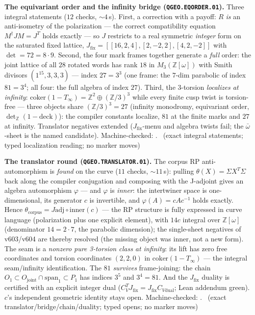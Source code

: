 \documentclass[11pt,a4paper]{article}
\theoremstyle{definition}
\begin{document}
\par\smallskip\noindent\textbf{The equivariant order and the infinity
bridge (\texttt{QGEO.EQORDER.01}).}
Three integral statements ($12$ checks, ${\sim}4$\,s).  First, a
correction with a payoff: $R$ \emph{is} an anti-isometry of the
polarization --- the correct compatibility equation
$M^\dagger JM=J^T$ holds exactly --- so $J$ restricts to a real
symmetric \emph{integer} form on the saturated fixed lattice,
$J_{\mathrm{fix}}=[[16,2,4],[2,-2,2],[4,2,-2]]$ with
$\det=72=8\cdot9$.  Second, the four mark frames together generate a
\emph{full} order: the joint lattice of all $28$ rotated words has
rank $18$ in $M_3(\mathbb{Z}[\omega])$ with Smith divisors
$(1^{15},3,3,3)$ --- index $27=3^3$ (one frame: the $7$-dim parabolic
of index $81=3^4$; all four: the full algebra of index $27$).  Third,
the 3-torsion \emph{localizes at infinity}:
$\mathrm{coker}(1-T_\infty)=\mathbb{Z}^2\oplus(\mathbb{Z}/3)^3$ while
every finite cusp twist is torsion-free --- three objects share
$(\mathbb{Z}/3)^3=27$ (infinity monodromy, equivariant order,
$\det_{\mathbb{Z}}(1-\mathrm{deck})$): the compiler constants
localize, $81$ at the finite marks and $27$ at infinity.  Translator
negatives extended ($J_{\mathrm{fix}}$-menu and algebra twists fail;
the $\bar\omega$-sheet is the named candidate).
Machine-checked: .
\mE\ (exact integral statements; typed localization reading; no
marker moves)
\par\smallskip

\par\smallskip\noindent\textbf{The translator round
(\texttt{QGEO.TRANSLATOR.01}).}
The corpus RP anti-automorphism is \emph{found} on the curve ($11$
checks, ${\sim}11$\,s): pulling $\theta(X)=\Sigma X^T\Sigma$ back
along the compiler conjugation and composing with the J-adjoint gives
an algebra automorphism $\varphi$ --- and $\varphi$ is \emph{inner}:
the intertwiner space is one-dimensional, its generator $c$ is
invertible, and $\varphi(A)=cAc^{-1}$ holds exactly.  Hence
$\theta_{\mathrm{corpus}}=J\mathrm{adj}\circ\mathrm{inner}(c)$ --- the
RP structure is fully expressed in curve language (polarization plus
one explicit element), with $14c$ integral over
$\mathbb{Z}[\omega]$ (denominator $14=2\cdot7$, the parabolic
dimension); the single-sheet negatives of v603/v604 are thereby
resolved (the missing object was inner, not a new form).  The seam is
a \emph{nonzero pure 3-torsion class at infinity}: its lift has zero
free coordinates and torsion coordinates $(2,2,0)$ in
$\mathrm{coker}(1-T_\infty)$ --- the integral seam/infinity
identification.  The $81$ \emph{survives} frame-joining: the chain
$O_1\subset O_{\mathrm{joint}}\cap\mathrm{span}_1\subset P_1$ has
indices $3^5$ and $3^4=81$.  And the $J_{\mathrm{fix}}$ duality is
certified with an explicit integer dual
($C_V^TJ_{\mathrm{fix}}=J_{\mathrm{fix}}C_{V\mathrm{dual}}$; Lean
addendum green).  $c$'s independent geometric identity stays open.
Machine-checked: .
\mE\ (exact translator/bridge/chain/duality; typed opens; no marker
moves)
\par\smallskip
\end{document}
